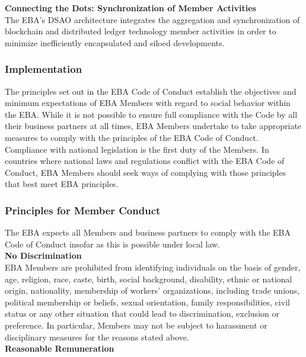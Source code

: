 \documentclass{article}
\begin{document}
\textbf{Connecting the Dots: Synchronization of Member Activities} \\

The EBA's DSAO architecture integrates the aggregation and synchronization of blockchain and distributed ledger technology member activities in order to minimize inefficiently encapsulated and siloed developments. \\

\subsubsection{Implementation}

The principles set out in the EBA Code of Conduct establish the objectives and minimum expectations of EBA Members with regard to social behavior within the EBA.
While it is not possible to ensure full compliance with the Code by all their business partners at all times, EBA Members undertake to take appropriate measures to comply with the principles of the EBA Code of Conduct. \\
Compliance with national legislation is the first duty of the Members. 
In countries where national laws and regulations conflict with the EBA Code of Conduct, EBA Members should seek ways of complying with those principles that best meet EBA principles.

\subsubsection{Principles for Member Conduct}

The EBA expects all Members and business partners to comply with the EBA Code of Conduct insofar as this is possible under local law. \\

\textbf{No Discrimination} \\

EBA Members are prohibited from identifying individuals on the basis of gender, age, religion, race, caste, birth, social background, disability, ethnic or national origin, nationality, membership of workers' organizations, including trade unions, political membership or beliefs, sexual orientation, family responsibilities, civil status or any other situation that could lead to discrimination, exclusion or preference. 
In particular, Members may not be subject to harassment or disciplinary measures for the reasons stated above. \\

\textbf{Reasonable Remuneration} \\
\end{document}
